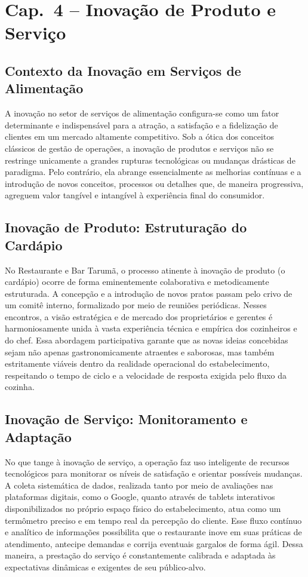 \documentclass[12pt, a4paper]{article}
\begin{document}
\section{Cap.~4 – Inovação de Produto e Serviço}

\subsection{Contexto da Inovação em Serviços de Alimentação}
A inovação no setor de serviços de alimentação configura-se como um fator determinante e indispensável para a atração, a satisfação e a fidelização de clientes em um mercado altamente competitivo. Sob a ótica dos conceitos clássicos de gestão de operações, a inovação de produtos e serviços não se restringe unicamente a grandes rupturas tecnológicas ou mudanças drásticas de paradigma. Pelo contrário, ela abrange essencialmente as melhorias contínuas e a introdução de novos conceitos, processos ou detalhes que, de maneira progressiva, agreguem valor tangível e intangível à experiência final do consumidor.

\subsection{Inovação de Produto: Estruturação do Cardápio}
No Restaurante e Bar Tarumã, o processo atinente à inovação de produto (o cardápio) ocorre de forma eminentemente colaborativa e metodicamente estruturada. A concepção e a introdução de novos pratos passam pelo crivo de um comitê interno, formalizado por meio de reuniões periódicas. Nesses encontros, a visão estratégica e de mercado dos proprietários e gerentes é harmoniosamente unida à vasta experiência técnica e empírica dos cozinheiros e do chef. Essa abordagem participativa garante que as novas ideias concebidas sejam não apenas gastronomicamente atraentes e saborosas, mas também estritamente viáveis dentro da realidade operacional do estabelecimento, respeitando o tempo de ciclo e a velocidade de resposta exigida pelo fluxo da cozinha.

\subsection{Inovação de Serviço: Monitoramento e Adaptação}
No que tange à inovação de serviço, a operação faz uso inteligente de recursos tecnológicos para monitorar os níveis de satisfação e orientar possíveis mudanças. A coleta sistemática de dados, realizada tanto por meio de avaliações nas plataformas digitais, como o Google, quanto através de tablets interativos disponibilizados no próprio espaço físico do estabelecimento, atua como um termômetro preciso e em tempo real da percepção do cliente. Esse fluxo contínuo e analítico de informações possibilita que o restaurante inove em suas práticas de atendimento, antecipe demandas e corrija eventuais gargalos de forma ágil. Dessa maneira, a prestação do serviço é constantemente calibrada e adaptada às expectativas dinâmicas e exigentes de seu público-alvo.
\end{document}
